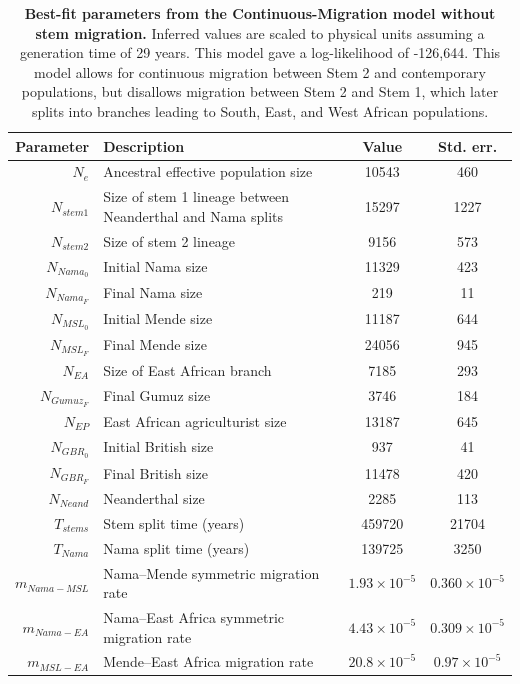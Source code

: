 \documentclass[]{article}
\begin{document}
\begin{table}[ht]
\caption{
    \label{tab:supp-continuous-migration-no-mig}
    \textbf{Best-fit parameters from the Continuous-Migration model without stem migration.}
    Inferred values are scaled to physical units assuming a generation time of
    29 years. This model gave a log-likelihood of -126,644. This model allows for
    continuous migration between Stem 2 and contemporary populations, but disallows
    migration between Stem 2 and Stem 1, which later splits into branches leading
    to South, East, and West African populations.
}
\centering
\begin{tabular}[t]{rP{8cm}cc}
    \toprule
    Parameter & Description & Value & Std. err.\\
    \midrule
    $N_e$ & Ancestral effective population size & 10543 & 460 \\
    $N_{stem1}$ & Size of stem 1 lineage between Neanderthal and Nama splits & 15297 & 1227 \\
    $N_{stem2}$ & Size of stem 2 lineage & 9156 & 573 \\
    $N_{Nama_0}$ & Initial Nama size & 11329 & 423 \\
    $N_{Nama_F}$ & Final Nama size & 219 & 11 \\
    $N_{MSL_0}$ & Initial Mende size & 11187 & 644 \\
    $N_{MSL_F}$ & Final Mende size & 24056 & 945 \\
    $N_{EA}$ & Size of East African branch & 7185 & 293 \\
    $N_{Gumuz_F}$ & Final Gumuz size & 3746 & 184 \\
    $N_{EP}$ & East African agriculturist size & 13187 & 645 \\
    $N_{GBR_0}$ & Initial British size & 937 & 41 \\
    $N_{GBR_F}$ & Final British size & 11478 & 420 \\
    $N_{Neand}$ & Neanderthal size & 2285 & 113 \\
    $T_{stems}$ & Stem split time (years) & 459720 & 21704 \\
    $T_{Nama}$ & Nama split time (years) & 139725 & 3250 \\
    $m_{Nama-MSL}$ & Nama--Mende symmetric migration rate & $1.93\times10^{-5}$ & $0.360\times10^{-5}$ \\
    $m_{Nama-EA}$ & Nama--East Africa symmetric migration rate & $4.43\times10^{-5}$ & $0.309\times10^{-5}$ \\
    $m_{MSL-EA}$ & Mende--East Africa migration rate & $20.8\times10^{-5}$ & $0.97\times10^{-5}$ \\

\end{tabular}
\end{table}
\end{document}
